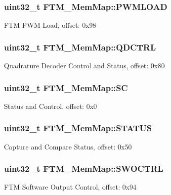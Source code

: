 \subsubsection[{P\+W\+M\+L\+O\+A\+D}]{\setlength{\rightskip}{0pt plus 5cm}uint32\+\_\+t F\+T\+M\+\_\+\+Mem\+Map\+::\+P\+W\+M\+L\+O\+A\+D}\label{struct_f_t_m___mem_map_a84f64d9ce40acaa01380dab13bc5b5ea}
F\+T\+M P\+W\+M Load, offset\+: 0x98 \hypertarget{struct_f_t_m___mem_map_a88687af53ea301e8e0c793d8539dd4dd}{}
\subsubsection[{Q\+D\+C\+T\+R\+L}]{\setlength{\rightskip}{0pt plus 5cm}uint32\+\_\+t F\+T\+M\+\_\+\+Mem\+Map\+::\+Q\+D\+C\+T\+R\+L}\label{struct_f_t_m___mem_map_a88687af53ea301e8e0c793d8539dd4dd}
Quadrature Decoder Control and Status, offset\+: 0x80 \hypertarget{struct_f_t_m___mem_map_a4b1c487fee64f94a40d5f170865fe466}{}
\subsubsection[{S\+C}]{\setlength{\rightskip}{0pt plus 5cm}uint32\+\_\+t F\+T\+M\+\_\+\+Mem\+Map\+::\+S\+C}\label{struct_f_t_m___mem_map_a4b1c487fee64f94a40d5f170865fe466}
Status and Control, offset\+: 0x0 \hypertarget{struct_f_t_m___mem_map_a9d49382f07b934530245cb8f578e117f}{}
\subsubsection[{S\+T\+A\+T\+U\+S}]{\setlength{\rightskip}{0pt plus 5cm}uint32\+\_\+t F\+T\+M\+\_\+\+Mem\+Map\+::\+S\+T\+A\+T\+U\+S}\label{struct_f_t_m___mem_map_a9d49382f07b934530245cb8f578e117f}
Capture and Compare Status, offset\+: 0x50 \hypertarget{struct_f_t_m___mem_map_afb4481ebbb2867c1bc009d6b73ad661e}{}
\subsubsection[{S\+W\+O\+C\+T\+R\+L}]{\setlength{\rightskip}{0pt plus 5cm}uint32\+\_\+t F\+T\+M\+\_\+\+Mem\+Map\+::\+S\+W\+O\+C\+T\+R\+L}\label{struct_f_t_m___mem_map_afb4481ebbb2867c1bc009d6b73ad661e}
F\+T\+M Software Output Control, offset\+: 0x94 \hypertarget{struct_f_t_m___mem_map_a9537a55fae48de4811bfe7600d37b230}{}
